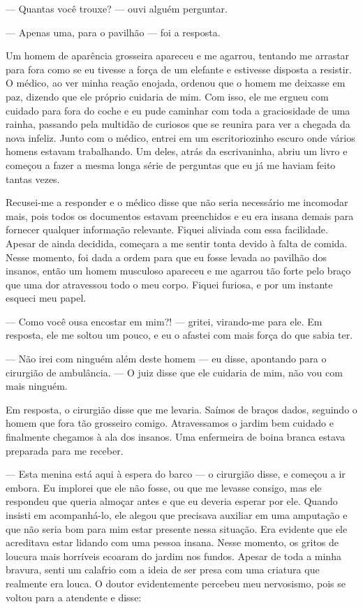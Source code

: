 --- Quantas você
trouxe? --- ouvi alguém perguntar. 

--- Apenas uma, para o pavilhão ---
foi a resposta.

Um homem de aparência grosseira apareceu e me agarrou,
tentando me arrastar para fora como se eu tivesse a força de um elefante
e estivesse disposta a resistir. O médico, ao ver minha reação enojada,
ordenou que o homem me deixasse em paz, dizendo que ele próprio cuidaria
de mim. Com isso, ele me ergueu com cuidado para fora do coche e eu pude
caminhar com toda a graciosidade de uma rainha, passando pela multidão
de curiosos que se reunira para ver a chegada da nova infeliz. Junto com
o médico, entrei em um escritoriozinho escuro onde vários homens estavam
trabalhando. Um deles, atrás da escrivaninha, abriu um livro e começou a
fazer a mesma longa série de perguntas que eu já me haviam feito tantas
vezes.

Recusei-me a responder e o médico disse que não seria necessário me
incomodar mais, pois todos os documentos estavam preenchidos e eu era
insana demais para fornecer qualquer informação relevante. Fiquei
aliviada com essa facilidade. Apesar de ainda decidida,
começara a me sentir tonta devido à falta de comida. Nesse momento, foi
dada a ordem para que eu fosse levada ao pavilhão dos insanos, então um
homem musculoso apareceu e me agarrou tão forte pelo braço que uma dor
atravessou todo o meu corpo. Fiquei furiosa, e por um instante esqueci
meu papel.

--- Como você ousa encostar em mim?! --- gritei, virando-me para ele. 
Em resposta, ele me soltou um pouco, e eu o afastei com mais força do
que sabia ter.

--- Não irei com ninguém além deste homem --- eu disse, apontando para o
cirurgião de ambulância. --- O juiz disse que ele cuidaria de mim, não
vou com mais ninguém.

Em resposta, o cirurgião disse que me levaria. Saímos de braços dados,
seguindo o homem que fora tão grosseiro comigo. Atravessamos o jardim
bem cuidado e finalmente chegamos à ala dos insanos. Uma enfermeira de
boina branca estava preparada para me receber.

--- Esta menina está aqui à espera do barco --- o cirurgião disse, e
começou a ir embora. Eu implorei que ele não fosse, ou que me levasse
consigo, mas ele respondeu que queria almoçar antes e que eu deveria
esperar por ele. Quando insisti em acompanhá-lo, ele alegou que
precisava auxiliar em uma amputação e que não seria bom para mim estar
presente nessa situação. Era evidente que ele acreditava estar lidando
com uma pessoa insana. Nesse momento, os gritos de loucura mais
horríveis ecoaram do jardim nos fundos. Apesar de toda a minha bravura,
senti um calafrio com a ideia de ser presa com uma criatura que
realmente era louca. O doutor evidentemente percebeu meu nervosismo,
pois se voltou para a atendente e disse:

